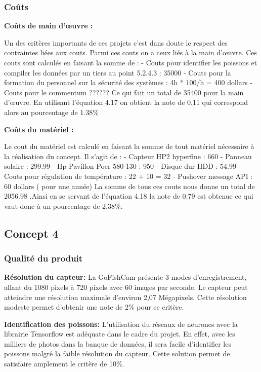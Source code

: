 \subsubsection{Coûts}


\textbf{Coûts de main d’œuvre : }

Un des critères importants de ces projets c’est dans doute le respect des contraintes liées aux couts. Parmi ces couts on a ceux liés à la main d’œuvre. Ces couts sont calculés en faisant la somme de : 
-	Couts pour identifier les poissons et compiler les données par un tiers au point 5.2.4.3 : 35000
-	Couts pour la formation du personnel sur la sécurité des systèmes : 4h * 100/h = 400 dollars
-	Couts pour le commentum ??????
Ce qui fait un total de 35400 pour la main d’œuvre. En utilisant l’équation 4.17 on obtient la note de 0.11 qui correspond alors au pourcentage de 1.38\%

\textbf{Coûts du matériel : }

Le cout du matériel est calculé en faisant la somme de tout matériel nécessaire à la réalisation du concept. Il s’agit de :
-	Capteur HP2 hyperfine : 660
-	Panneau solaire : 299.99
-	Hp Pavillon Poer 580-130 : 950
-	Disque dur HDD : 54.99
-	Couts pour régulation de température : 22 + 10 = 32
-	Pushover message API : 60 dollars ( pour une année)
La somme de tous ces couts nous donne un total de 2056.98  .Ainsi en se servant de l’équation  4.18 la note de 0.79  est obtenue ce qui vaut donc à un pourcentage de 2.38\%.


\subsection{Concept 4}

\subsubsection{Qualité du produit}

\textbf{Résolution du capteur:} La GoFishCam présente 3 modes d'enregistrement, allant du 1080 pixels à 720 pixels avec 60 images par seconde. Le capteur peut atteindre une résolution maximale d'environ 2,07 Mégapixels. Cette résolution modeste permet d'obtenir une note de 2\% pour ce critère. \vspace{5mm}

\textbf{Identification des poissons:} L'utilisation du réseaux de neurones avec la librairie Tensorflow est adéquate dans le cadre du projet. En effet, avec les milliers de photos dans la banque de données, il sera facile d'identifier les poissons malgré la faible résolution du capteur. Cette solution permet de satisfaire amplement le critère de 10\%. \vspace{5mm}


